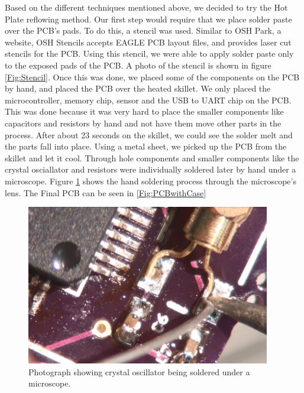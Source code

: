 Based on the different techniques mentioned above,
we decided to try the Hot Plate reflowing method.
Our first step would require that we place solder paste over the PCB's pads.
To do this,
a stencil was used.
Similar to OSH Park, a website, OSH Stencils accepts EAGLE PCB layout files,
and provides laser cut stencils for the PCB.
Using this stencil,
we were able to apply solder paste only to the exposed pads of the PCB.
A photo of the stencil is shown in figure \ref{Fig:Stencil}.
Once this was done,
we placed some of the components on the PCB by hand,
and placed the PCB over the heated skillet.
We only placed the microcontroller, memory chip, sensor and the USB to UART chip on the PCB.
This was done because it was very hard to place the smaller components like capacitors and resistors by hand and not have them move other parts in the process.
After about 23 seconds on the skillet,
we could see the solder melt and the parts fall into place.
Using a metal sheet,
we picked up the PCB from the skillet and let it cool.
Through hole components and smaller components like the crystal osciallator and resistors were individually soldered later by hand under a microscope.
Figure \ref{Fig:PCBMicro} shows the hand soldering process through the microscope's lens. The Final PCB can be seen in \ref{Fig:PCBwithCase}
\begin{figure}
\begin{center}
\includegraphics[width=0.95\textwidth]{images/PCBMicro.jpg}
\caption{Photograph showing crystal oscillator being soldered under a microscope.}
\label{Fig:PCBMicro}
\end{center}
\end{figure}
